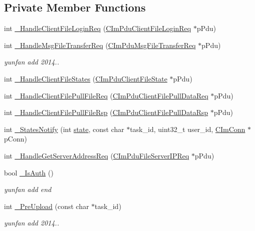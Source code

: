 \subsection*{Private Member Functions}
\begin{DoxyCompactItemize}
\item 
int \hyperlink{class_c_file_conn_ade1c65cb664bcec2a57490db3d40a77b}{\+\_\+\+Handle\+Client\+File\+Login\+Req} (\hyperlink{class_c_im_pdu_client_file_login_req}{C\+Im\+Pdu\+Client\+File\+Login\+Req} $\ast$p\+Pdu)
\item 
int \hyperlink{class_c_file_conn_a9f791f0b35cbbffa952ef7fb3796e9e5}{\+\_\+\+Handle\+Msg\+File\+Transfer\+Req} (\hyperlink{class_c_im_pdu_msg_file_transfer_req}{C\+Im\+Pdu\+Msg\+File\+Transfer\+Req} $\ast$p\+Pdu)
\begin{DoxyCompactList}\small\item\em yunfan add 2014.. \end{DoxyCompactList}\item 
int \hyperlink{class_c_file_conn_a02d4b3e7d8a71fd0e0d7f865a79f1712}{\+\_\+\+Handle\+Client\+File\+States} (\hyperlink{class_c_im_pdu_client_file_state}{C\+Im\+Pdu\+Client\+File\+State} $\ast$p\+Pdu)
\item 
int \hyperlink{class_c_file_conn_a177d7a1472c7903fa3100aefe2f49603}{\+\_\+\+Handle\+Client\+File\+Pull\+File\+Req} (\hyperlink{class_c_im_pdu_client_file_pull_data_req}{C\+Im\+Pdu\+Client\+File\+Pull\+Data\+Req} $\ast$p\+Pdu)
\item 
int \hyperlink{class_c_file_conn_a3fb4537081f36cfc9d669047bbcf69d7}{\+\_\+\+Handle\+Client\+File\+Pull\+File\+Rsp} (\hyperlink{class_c_im_pdu_client_file_pull_data_rsp}{C\+Im\+Pdu\+Client\+File\+Pull\+Data\+Rsp} $\ast$p\+Pdu)
\item 
int \hyperlink{class_c_file_conn_a96e4ff2a031a1dc612609423f7ee7952}{\+\_\+\+States\+Notify} (int \hyperlink{_http_parser_8cpp_adc6e5733fc3c22f0a7b2914188c49c90}{state}, const char $\ast$task\+\_\+id, uint32\+\_\+t user\+\_\+id, \hyperlink{class_c_im_conn}{C\+Im\+Conn} $\ast$p\+Conn)
\item 
int \hyperlink{class_c_file_conn_a58d5a372888610256578a108387f33c0}{\+\_\+\+Handle\+Get\+Server\+Address\+Req} (\hyperlink{class_c_im_pdu_file_server_i_p_req}{C\+Im\+Pdu\+File\+Server\+I\+P\+Req} $\ast$p\+Pdu)
\item 
bool \hyperlink{class_c_file_conn_a9ccf2b42631445f279fe1b713a31ecf4}{\+\_\+\+Is\+Auth} ()
\begin{DoxyCompactList}\small\item\em yunfan add end \end{DoxyCompactList}\item 
int \hyperlink{class_c_file_conn_ae2e691a672ea8698544d3a5b5b5a275d}{\+\_\+\+Pre\+Upload} (const char $\ast$task\+\_\+id)
\begin{DoxyCompactList}\small\item\em yunfan add 2014.. \end{DoxyCompactList}\end{DoxyCompactItemize}
